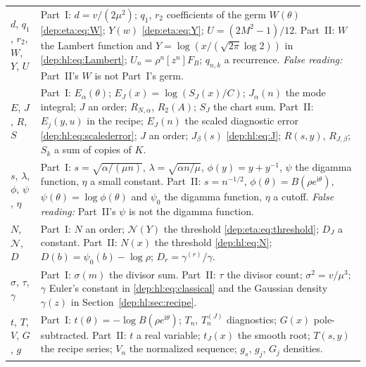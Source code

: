 \documentclass[11pt]{article}
\theoremstyle{definition}\newtheorem{definition}[theorem]{Definition}
\theoremstyle{remark}\newtheorem{remark}[theorem]{Remark}
\newcommand{\ii}{\mathrm i}
\begin{document}
\begin{longtable}{@{}>{\raggedright\arraybackslash}p{} >{\raggedright\arraybackslash}p{}@{}}
$d$, $q_1$, $r_2$, $W$, $Y$, $U$ & Part~I: $d=v/(2\mu^2)$; $q_1$, $r_2$ coefficients of the germ $W(\theta)$ \eqref{dep:eta:eq:W}; $Y(w)$ \eqref{dep:eta:eq:Y}; $U=(2M^2-1)/12$. Part~II: $W$ the Lambert function and $Y=\log(x/(\sqrt{2\pi}\log2))$ in \eqref{dep:hl:eq:Lambert}; $U_n=\rho^n[z^n]F_B$; $q_{n,k}$ a recurrence. \emph{False reading:} Part~II's $W$ is not Part~I's germ.\\
$E$, $J$, $R$, $S$ & Part~I: $E_\alpha(\theta)$; $E_J(x)=\log(S_J(x)/C)$; $J_\alpha(n)$ the mode integral; $J$ an order; $R_{N,\alpha}$, $R_2(A)$; $S_J$ the chart sum. Part~II: $E_j(y,u)$ in the recipe; $E_J(n)$ the scaled diagnostic error \eqref{dep:hl:eq:scalederror}; $J$ an order; $J_\beta(s)$ \eqref{dep:hl:eq:J}; $R(s,y)$, $R_{J,\beta}$; $S_k$ a sum of copies of $K$.\\
$s$, $\lambda$, $\phi$, $\psi$, $\eta$ & Part~I: $s=\sqrt{\alpha/(\mu n)}$, $\lambda=\sqrt{\alpha n/\mu}$, $\phi(y)=y+y^{-1}$, $\psi$ the digamma function, $\eta$ a small constant. Part~II: $s=n^{-1/2}$, $\phi(\theta)=B(\rho e^{\ii\theta})$, $\psi(\theta)=\log\phi(\theta)$ and $\psi_0$ the digamma function, $\eta$ a cutoff. \emph{False reading:} Part~II's $\psi$ is not the digamma function.\\
$N$, $\mathcal N$, $D$ & Part~I: $N$ an order; $\mathcal N(Y)$ the threshold \eqref{dep:eta:eq:threshold}; $D_J$ a constant. Part~II: $N(x)$ the threshold \eqref{dep:hl:eq:N}; $D(b)=\psi_0(b)-\log\rho$; $D_r=\gamma^{(r)}/\gamma$.\\
$\sigma$, $\tau$, $\gamma$ & Part~I: $\sigma(m)$ the divisor sum. Part~II: $\tau$ the divisor count; $\sigma^2=v/\mu^3$; $\gamma$ Euler's constant in \eqref{dep:hl:eq:classical} and the Gaussian density $\gamma(z)$ in Section~\ref{dep:hl:sec:recipe}.\\
$t$, $T$, $V$, $G$, $g$ & Part~I: $t(\theta)=-\log B(\rho e^{\ii\theta})$; $T_n$, $T_n^{(J)}$ diagnostics; $G(x)$ pole-subtracted. Part~II: $t$ a real variable; $t_J(x)$ the smooth root; $T(s,y)$ the recipe series; $V_n$ the normalized sequence; $g_s$, $g_j$, $G_j$ densities.\\
\bottomrule
\end{longtable}
\addtocounter{table}{-1}%
\endgroup
\end{document}
